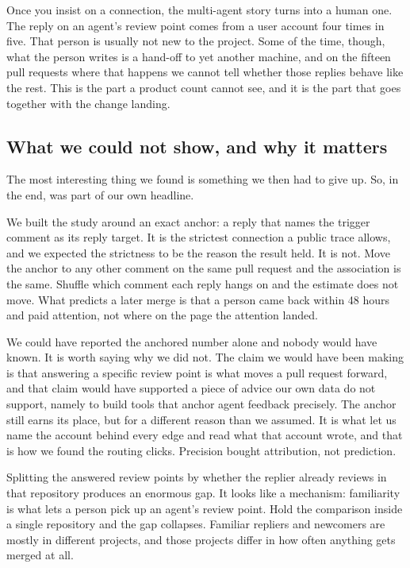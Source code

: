 \documentclass[lineno,pdflatex,sn-basic]{sn-jnl}
\begin{document}
Once you insist on a connection, the multi-agent story turns into a human one.
The reply on an agent's review point comes from a user account four times in
five.
That person is usually not new to the project. Some of the time, though, what the
person writes is a hand-off to yet another machine, and on the fifteen pull
requests where that happens we cannot tell whether those replies behave like the
rest. This is the part a product count
cannot see, and it is the part that goes together with the change landing.

\subsection{What we could not show, and why it matters}

The most interesting thing we found is something we then had to give up. So, in
the end, was part of our own headline.

We built the study around an exact anchor: a reply that names the trigger comment
as its reply target. It is the strictest connection a public trace allows, and we
expected the strictness to be the reason the result held. It is not. Move the
anchor to any other comment on the same pull request and the association is the
same. Shuffle which comment each reply hangs on and the estimate does not move.
What predicts a later merge is that a person came back within 48 hours and paid
attention, not where on the page the attention landed.

We could have reported the anchored number alone and nobody would have known. It
is worth saying why we did not. The claim we would have been making is that
answering a specific review point is what moves a pull request forward, and that claim would have supported a piece of advice our own data do not support,
namely to build tools that anchor agent feedback precisely. The anchor still earns its place,
but for a different reason than we assumed. It is what let us name the account
behind every edge and read what that account wrote, and that is how we found the
routing clicks. Precision bought attribution, not prediction.

Splitting the answered review points by whether the replier already reviews in
that repository produces an enormous gap. It looks like a mechanism: familiarity
is what lets a person pick up an agent's review point. Hold the comparison
inside a single repository and the gap collapses. Familiar repliers and
newcomers are mostly in different projects, and those projects differ in how
often anything gets merged at all.
\end{document}
